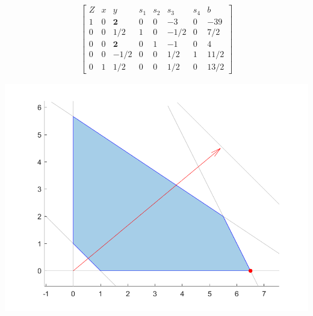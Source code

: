 \documentclass[10pt]{article}
\newenvironment{answerblock}[1]{\tcolorbox[beamer,noparskip,breakable,title={#1}]}{\endtcolorbox}
\begin{document}
\begin{answerblock}{Linear Programming Example Evaluation}
	\vspace{6pt}
	\begin{minipage}{0.6\textwidth}
		\begin{align*}
		\begin{bmatrix}
		Z	& x		& y		& s_1	& s_2	& s_3	& s_4	& b \\
		1	& 0		& \textbf{2}		& 0		& 0		& -3	& 0		& -39 \\
		0	& 0		& 1/2	& 1		& 0		& -1/2	& 0		& 7/2 \\
		0	& 0		& \textbf{2}		& 0		& 1		& -1	& 0		& 4 \\
		0	& 0		& -1/2	& 0		& 0		& 1/2	& 1		& 11/2 \\
		0	& 1		& 1/2	& 0		& 0		& 1/2	& 0		& 13/2
		\end{bmatrix}
		\end{align*}
	\end{minipage} \hfill
	\begin{minipage}{0.35\textwidth}
		\includegraphics[width = \textwidth]{images/paper_simplex_point_2.png}
	\end{minipage}


\end{answerblock}
\end{document}
